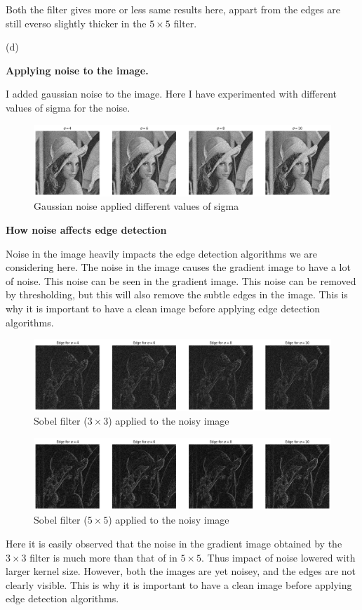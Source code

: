 Both the filter gives more or less same results here, appart from the edges are still everso slightly thicker in the $5\times5$ filter.

{\large(d)}

\textbf{Applying noise to the image.}

I added gaussian noise to the image. Here I have experimented with different values of sigma for the noise.

\begin{figure}[H]
    \includegraphics[width=1.06\textwidth]{res/2d_noise.png}
    \caption{Gaussian noise applied different values of sigma}
    \label{fig:2d_noise}
\end{figure}

\textbf{How noise affects edge detection}

Noise in the image heavily impacts the edge detection algorithms we are considering here. The noise in the image causes the gradient image to have a lot of noise. This noise can be seen in the gradient image. This noise can be removed by thresholding, but this will also remove the subtle edges in the image. This is why it is important to have a clean image before applying edge detection algorithms.

\begin{figure}[H]
    \includegraphics[width=1.06\textwidth]{res/2d_3by3.png}
    \caption{Sobel filter ($3\times3$) applied to the noisy image}
    \label{fig:2d_3by3}
\end{figure}


\begin{figure}[H]
    \includegraphics[width=1.06\textwidth]{res/2d_5by5.png}
    \caption{Sobel filter ($5\times5$) applied to the noisy image}
    \label{fig:2d_5by5}
\end{figure}

Here it is easily observed that the noise in the gradient image obtained by the $3\times3$ filter is much more than that of in $5\times5$. Thus impact of noise lowered with larger kernel size. However, both the images are yet noisey, and the edges are not clearly visible. This is why it is important to have a clean image before applying edge detection algorithms.